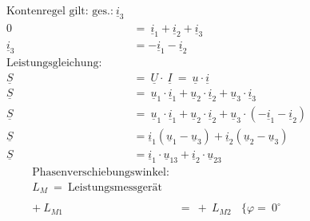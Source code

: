 \begin{enumerate}[label=\alph*)]
	      \begin{align*}
		      \text{Kontenregel gilt: ges.:}\  \underline{i}_3                                                                                                                 \\
		      0               & =\ \underline{i}_1 + \underline{i}_2 + \underline{i}_3                                                                                         \\
		      \underline{i}_3 & = - \underline{i}_1 - \underline{i}_2                                                                                                          \\
		      \text{Leistungsgleichung:}                                                                                                                                       \\
		      \underline{S}   & =\ \underline{U} \cdot\ \underline{I}\ =\ \underline{u} \cdot \underline{i}                                                                    \\
		      \underline{S}   & =\ \underline{u}_1 \cdot \underline{i}_1 + \underline{u}_2 \cdot \underline{i}_2 + \underline{u}_3 \cdot \underline{i}_3                       \\
		      \underline{S}   & =\ \underline{u}_1 \cdot \underline{i}_1 + \underline{u}_2 \cdot \underline{i}_2 + \underline{u}_3 \cdot (- \underline{i}_1 - \underline{i}_2) \\
		      \underline{S}   & = \underline{i}_1(\underline{u}_1 - \underline{u}_3) + \underline{i}_2(\underline{u}_2 - \underline{u}_3)                                      \\
		      \underline{S}   & = \underline{i}_1\cdot\underline{u}_{13} + \underline{i}_2\cdot\underline{u}_{23}
	      \end{align*}
	      \begin{align*}
		      \text{Phasenverschiebungswinkel:}                                          \\
		      L_{M}\ =\ \text{Leistungsmessgerät}                                        \\ \ \\
		      +\ L_{M1}   & =\ +\ L_{M2}\ \ \ \ \{ \varphi =\ 0^\circ                    \\

\end{align*}
\end{enumerate}
